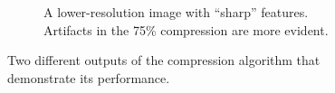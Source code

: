 \documentclass[12pt,technote]{IEEEtran}
\begin{document}
\begin{figure}
\begin{subfigure}[b]{0.3\textwidth}
        \caption{A lower-resolution image with ``sharp'' features. Artifacts in the 75\% compression are more evident.}
        \label{fig:letter_b}
    \end{subfigure}
    \label{fig:compression_outputs}
    \caption{Two different outputs of the compression algorithm that demonstrate its performance.}
\end{figure}


\end{document}
